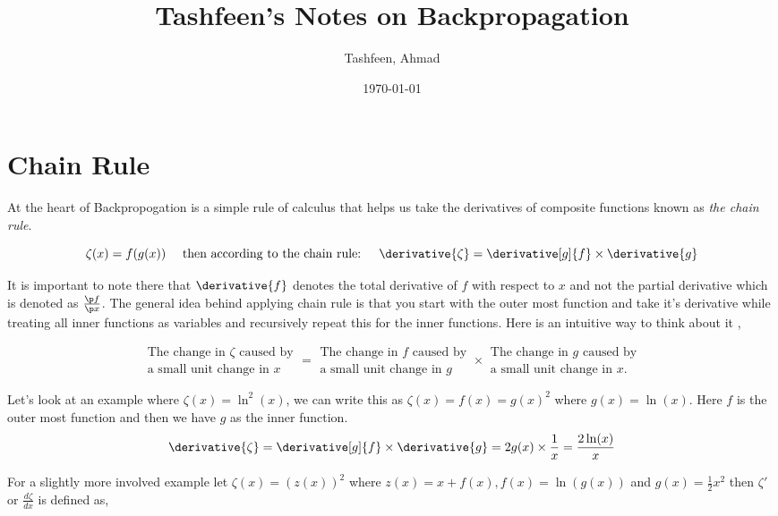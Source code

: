 \documentclass{homework}
\author{Tashfeen, Ahmad}
\date{\today}
\title{Tashfeen's Notes on Backpropagation}
\begin{document}
 \maketitle

\section{Chain Rule}

At the heart of Backpropogation is a simple rule of calculus that helps us take the derivatives of composite functions known as \textit{the chain rule}.

\[
  \zeta(x) = f(g(x)) \quad \text{ then according to the chain rule: } \quad
  \derivative{\zeta} = \derivative[g]{f} \times \derivative{g}
\]

It is important to note there that $\derivative{f}$ denotes the total derivative of $f$ with respect to $x$ and not the partial derivative which is denoted as $\frac{\p f}{\p x}$. The general idea behind applying chain rule is that you start with the outer most function and take it's derivative while treating all inner functions as variables and recursively repeat this for the inner functions. Here is an intuitive way to think about it \cite{3354744},

\[
  \begin{array}{c}
    \text{The change in }\zeta \text{ caused by} \\
    \text{a small unit change in }x
  \end{array}=\begin{array}{c}
    \text{The change in }f\text{ caused by} \\
    \text{a small unit change in }g
  \end{array}\times\begin{array}{c}
    \text{The change in }g\text{ caused by} \\
    \text{a small unit change in }x.
  \end{array}
\]

Let's look at an example where $\zeta(x) = \ln^2(x)$, we can write this as $\zeta(x) = f(x) = g(x)^2$ where $g(x) = \ln(x)$. Here $f$ is the outer most function and then we have $g$ as the inner function.
\[
  \derivative{\zeta} = \derivative[g]{f} \times \derivative{g} = 2g(x)\times \frac{1}{x} = \frac{2\ln(x)}{x}
\]

For a slightly more involved example let $\zeta(x) = (z(x))^2$ where $z(x) = x + f(x), f(x) = \ln(g(x))$ and $g(x) = \frac{1}{2}x^2$ then $\zeta'$ or $\frac{d\zeta}{dx}$ is defined as,
\end{document}
